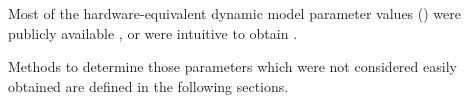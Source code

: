 \documentclass[crop=false,float=true,class=scrreprt]{standalone}
\begin{document}
Most of the hardware-equivalent dynamic model parameter values
{\fns ()}
were publicly available
\cite{REF:conference:2015-howard, REF:online:philohome}, 
or were intuitive to obtain
{}.

Methods to determine those parameters which were not considered easily obtained
are defined in the following sections.




\vspace{+2em}
\end{document}
